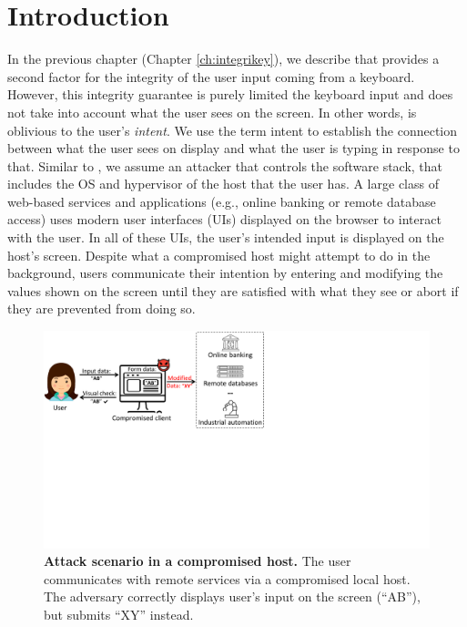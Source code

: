 \section{Introduction}
\label{integriscreen:sec:intro}

In the previous chapter (Chapter \ref{ch:integrikey}), we describe \integrikey that provides a second factor for the integrity of the user input coming from a keyboard. However, this integrity guarantee is purely limited the keyboard input and does not take into account what the user sees on the screen. In other words, \integrikey is oblivious to the user's \emph{intent}. We use the term intent to establish the connection between what the user sees on display and what the user is typing in response to that. Similar to \integrikey, we assume an attacker that controls the software stack, that includes the OS and hypervisor of the host that the user has. A large class of web-based services and applications (e.g., online banking or remote database access) uses modern user interfaces (UIs) displayed on the browser to interact with the user. In all of these UIs, the user's intended input is displayed on the host's screen. Despite what a compromised host might attempt to do in the background, users communicate their intention by entering and modifying the values shown on the screen until they are satisfied with what they see or abort if they are prevented from doing so.


\begin{figure}[t]
 \centering
\includegraphics[trim={0 10.4cm 14.4cm 0},clip,width=0.75\linewidth]{chapters/IntegriScreen/img/motivatingScenario.pdf}
\caption[Attack scenario in a compromised host]{\textbf{Attack scenario in a compromised host.}
 	The user communicates with remote services via a compromised local host. The adversary correctly displays user's input on the screen (``AB''), but submits ``XY'' instead.
 	}
 \label{fig:scenario}
\end{figure}



